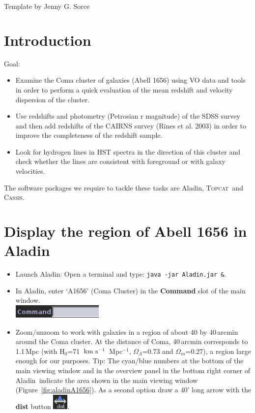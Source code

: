 \documentclass [a4paper, 12pt]{article}
\def\kms{\rm km\ s^{-1}}
\newcommand{\aladin}{{\textsc{A}{ladin}}}
\newcommand{\topcat}{{\textsc{Topcat}}}
\newcommand{\cassis}{{\textsc{Cassis}}}
\begin{document}
\vspace{3.5cm}
Template by Jenny G. Sorce


\newpage
\normalsize
\vfill
\tableofcontents
\vfill

\newpage

\justify
\section{Introduction}

Goal: 
\begin{itemize}
\item  Examine the Coma cluster of galaxies (Abell 1656) using VO data and tools in order to perform a quick evaluation of the mean redshift and velocity dispersion of the cluster. 
\item Use redshifts and photometry (Petrosian r magnitude) of the SDSS survey and then add redshifts of the CAIRNS survey (Rines et al. 2003) in order to improve the completeness of the redshift sample. 
\item Look for hydrogen lines in HST spectra in the direction of this cluster and check whether the lines are consistent with foreground or with galaxy velocities.\\
\end{itemize}
\noindent The software packages we require to tackle these tasks are \aladin, 
\topcat\ and \cassis.

\section{Display the region of Abell 1656 in \aladin}
\label{sec:display}
\begin{itemize}
\item Launch \aladin: Open a terminal and type: \texttt{java -jar Aladin.jar 
\&}.
\item In \aladin, enter `A1656' (Coma Cluster) in the \textbf{Command} slot of 
the main window. \\
\includegraphics[width=0.2 \textwidth]{../images/aladin_command_empty.png}
\item Zoom/unzoom to work with galaxies in a region of about 40 by 40\,arcmin 
around the Coma cluster. At the distance of Coma, 40\,arcmin corresponds to 
1.1\,Mpc (with H$_0$=71~$\kms$~Mpc$^{-1}$, $\Omega_\Lambda$=0.73 and 
$\Omega_m$=0.27), a region large enough for our purposes. Tip: 
The cyan/blue numbers at the bottom of the main viewing window and in the 
overview panel in the bottom right corner of \aladin\ indicate the area shown 
in the main viewing window (Figure~\ref{fig:aladinA1656}). As a second option 
draw a 40' long arrow with the 
\textbf{dist} button \includegraphics[width=0.03  
\textwidth]{../images/aladin_button_distance.png}. 
\end{itemize}
\end{document}
